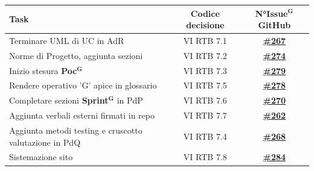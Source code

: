 \documentclass[a4paper,12pt]{article}
\newcommand{\term}[1]{\textbf{#1}$^\mathbf{G}$}
\newcommand{\ignoreglossary}{}
\begin{document}
\begin{center}
\small
\renewcommand{\arraystretch}{1.2} 
\begin{tabular}{|p{}|c|c|}
\hline
\rowcolor{gray!60} 
\textbf{Task} & \textbf{Codice decisione} & \textbf{N°\term{Issue} GitHub} \\
\hline
\rowcolor{white}
Terminare UML di UC in AdR & VI \ignoreglossary{RTB} 7.1 & \href{https://github.com/SWE-BitByBit/SWE-docs/issues/267}{\textbf{\#267}} \\
\hline
\rowcolor{gray!20}
Norme di Progetto, aggiunta sezioni & VI \ignoreglossary{RTB} 7.2 & \href{https://github.com/SWE-BitByBit/SWE-docs/issues/274}{\textbf{\#274}} \\
\hline
\rowcolor{white}
Inizio stesura \term{Poc} & VI \ignoreglossary{RTB} 7.3 & \href{https://github.com/SWE-BitByBit/SWE-docs/issues/279}{\textbf{\#279}} \\
\hline
\rowcolor{gray!20}
Rendere operativo 'G' apice in glossario & VI \ignoreglossary{RTB} 7.5 & \href{https://github.com/SWE-BitByBit/SWE-docs/issues/278}{\textbf{\#278}} \\
\hline
\rowcolor{white}
Completare sezioni \term{Sprint} in PdP & VI \ignoreglossary{RTB} 7.6 & \href{https://github.com/SWE-BitByBit/SWE-docs/issues/270}{\textbf{\#270}} \\
\hline
\rowcolor{gray!20}
Aggiunta verbali esterni firmati in repo & VI \ignoreglossary{RTB} 7.7 & \href{https://github.com/SWE-BitByBit/SWE-docs/issues/262}{\textbf{\#262}} \\
\hline
\rowcolor{white}
Aggiunta metodi testing e cruscotto valutazione in PdQ & VI \ignoreglossary{RTB} 7.4 & \href{https://github.com/SWE-BitByBit/SWE-docs/issues/278}{\textbf{\#268}} \\
\hline
\rowcolor{gray!20}
Sistemazione sito & VI \ignoreglossary{RTB} 7.8 & \href{https://github.com/SWE-BitByBit/SWE-docs/issues/284}{\textbf{\#284}} \\
\hline
\end{tabular}
\end{center}
\end{document}
